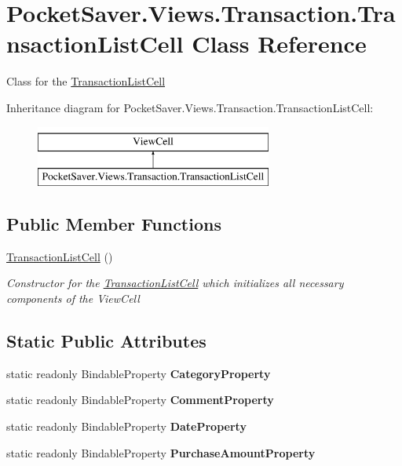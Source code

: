 \hypertarget{class_pocket_saver_1_1_views_1_1_transaction_1_1_transaction_list_cell}{}\section{Pocket\+Saver.\+Views.\+Transaction.\+Transaction\+List\+Cell Class Reference}
\label{class_pocket_saver_1_1_views_1_1_transaction_1_1_transaction_list_cell}


Class for the \hyperlink{class_pocket_saver_1_1_views_1_1_transaction_1_1_transaction_list_cell}{Transaction\+List\+Cell}  


Inheritance diagram for Pocket\+Saver.\+Views.\+Transaction.\+Transaction\+List\+Cell\+:\begin{figure}[H]
\begin{center}
\leavevmode
\includegraphics[height=2.000000cm]{class_pocket_saver_1_1_views_1_1_transaction_1_1_transaction_list_cell}
\end{center}
\end{figure}
\subsection*{Public Member Functions}
\begin{DoxyCompactItemize}
\item 
\hyperlink{class_pocket_saver_1_1_views_1_1_transaction_1_1_transaction_list_cell_a26039352cfde76eb1bca9b6c2141fae1}{Transaction\+List\+Cell} ()
\begin{DoxyCompactList}\small\item\em Constructor for the \hyperlink{class_pocket_saver_1_1_views_1_1_transaction_1_1_transaction_list_cell}{Transaction\+List\+Cell} which initializes all necessary components of the View\+Cell \end{DoxyCompactList}\end{DoxyCompactItemize}
\subsection*{Static Public Attributes}
\begin{DoxyCompactItemize}
\item 
static readonly Bindable\+Property {\bfseries Category\+Property}
\item 
static readonly Bindable\+Property {\bfseries Comment\+Property}
\item 
static readonly Bindable\+Property {\bfseries Date\+Property}
\item 
static readonly Bindable\+Property {\bfseries Purchase\+Amount\+Property}
\end{DoxyCompactItemize}
